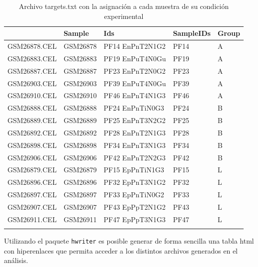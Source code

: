 \documentclass[a4paper]{article}\usepackage[]{graphicx}\usepackage[]{color}
\makeatletter
\newenvironment{kframe}{%
 \def\at@end@of@kframe{}%
 \ifinner\ifhmode%
  \def\at@end@of@kframe{\end{minipage}}%
  \begin{minipage}{\columnwidth}%
 \fi\fi%
 \def\FrameCommand##1{\hskip\@totalleftmargin \hskip-\fboxsep
 \colorbox{shadecolor}{##1}\hskip-\fboxsep
     \hskip-\linewidth \hskip-\@totalleftmargin \hskip\columnwidth}%
 \MakeFramed {\advance\hsize-\width
   \@totalleftmargin\z@ \linewidth\hsize
   \@setminipage}}%
 {\par\unskip\endMakeFramed%
 \at@end@of@kframe}
\newenvironment{knitrout}{}{} %
\makeatother
\begin{document}
\begin{longtable}{rllll}
  \hline
 & Sample & Ids & SampleIDs & Group \\ 
  \hline
GSM26878.CEL & GSM26878 & PF14 EnPnT2N1G2 & PF14 & A \\ 
  GSM26883.CEL & GSM26883 & PF19 EnPuT4N0Gu & PF19 & A \\ 
  GSM26887.CEL & GSM26887 & PF23 EnPnT2N0G2 & PF23 & A \\ 
  GSM26903.CEL & GSM26903 & PF39 EnPuT4N0Gu & PF39 & A \\ 
  GSM26910.CEL & GSM26910 & PF46 EnPnT4N1G3 & PF46 & A \\ 
  GSM26888.CEL & GSM26888 & PF24 EnPnTiN0G3 & PF24 & B \\ 
  GSM26889.CEL & GSM26889 & PF25 EnPnT3N2G2 & PF25 & B \\ 
  GSM26892.CEL & GSM26892 & PF28 EnPnT2N1G3 & PF28 & B \\ 
  GSM26898.CEL & GSM26898 & PF34 EnPnT3N1G3 & PF34 & B \\ 
  GSM26906.CEL & GSM26906 & PF42 EnPnT2N2G3 & PF42 & B \\ 
  GSM26879.CEL & GSM26879 & PF15 EpPnTiN1G3 & PF15 & L \\ 
  GSM26896.CEL & GSM26896 & PF32 EpPnT3N1G2 & PF32 & L \\ 
  GSM26897.CEL & GSM26897 & PF33 EpPnTiN0G2 & PF33 & L \\ 
  GSM26907.CEL & GSM26907 & PF43 EpPpT2N1G2 & PF43 & L \\ 
  GSM26911.CEL & GSM26911 & PF47 EpPpT3N1G3 & PF47 & L \\ 
   \hline
\hline
\caption{Archivo targets.txt con la asignación a cada muestra de su condición experimental} 
\label{table.targets}
\end{longtable}


Utilizando el paquete \texttt{hwriter} es posible generar de forma sencilla una tabla html con hiperenlaces que permita acceder a los distintos archivos generados en el análisis.

\begin{knitrout}
\color{fgcolor}\begin{kframe}


{\ttfamily\noindent\bfseries{}}\end{kframe}
\end{knitrout}
\end{document}
